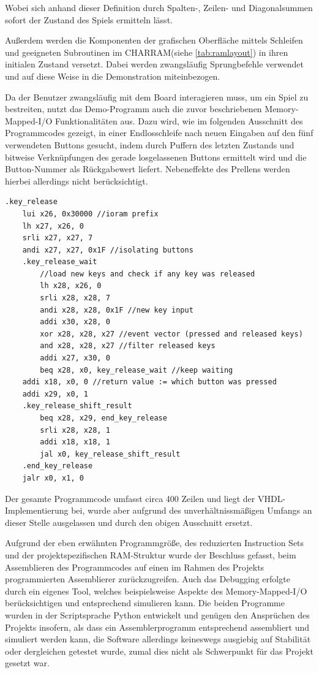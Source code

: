 Wobei sich anhand dieser Definition durch Spalten-, Zeilen- und Diagonalsummen sofort der Zustand des Spiels ermitteln l\"asst.

Au\ss{}erdem werden die Komponenten der grafischen Oberfl\"ache mittels Schleifen und geeigneten Subroutinen im CHARRAM(siehe \ref{tab:ramlayout}) in ihren initialen Zustand versetzt. Dabei werden zwangsl\"aufig Sprungbefehle verwendet und auf diese Weise in die Demonstration miteinbezogen.

Da der Benutzer zwangsl\"aufig mit dem Board interagieren muss, um ein Spiel zu bestreiten, nutzt das Demo-Programm auch die zuvor beschriebenen Memory-Mapped-I/O Funktionalit\"aten aus. Dazu wird, wie im folgenden Ausschnitt des Programmcodes gezeigt, in einer Endlosschleife nach neuen Eingaben auf den f\"unf verwendeten Buttons gesucht, indem durch Puffern des letzten Zustands und bitweise Verkn\"upfungen des gerade losgelassenen Buttons ermittelt wird und die Button-Nummer als R\"uckgabewert liefert. Nebeneffekte des Prellens werden hierbei allerdings nicht ber\"ucksichtigt.

\begin{lstlisting}
.key_release
	lui x26, 0x30000 //ioram prefix
	lh x27, x26, 0
	srli x27, x27, 7
	andi x27, x27, 0x1F //isolating buttons
	.key_release_wait
		//load new keys and check if any key was released
		lh x28, x26, 0
		srli x28, x28, 7
		andi x28, x28, 0x1F //new key input
		addi x30, x28, 0
		xor x28, x28, x27 //event vector (pressed and released keys)
		and x28, x28, x27 //filter released keys
		addi x27, x30, 0
		beq x28, x0, key_release_wait //keep waiting
	addi x18, x0, 0 //return value := which button was pressed
	addi x29, x0, 1
	.key_release_shift_result
		beq x28, x29, end_key_release
		srli x28, x28, 1
		addi x18, x18, 1
		jal x0, key_release_shift_result
	.end_key_release
	jalr x0, x1, 0
\end{lstlisting}

Der gesamte Programmcode umfasst circa 400 Zeilen und liegt der VHDL-Implementierung bei, wurde aber aufgrund des unverh\"altnissm\"a\ss{}igen Umfangs an dieser Stelle ausgelassen und durch den obigen Ausschnitt ersetzt.


Aufgrund der eben erw\"ahnten Programmgr\"o\ss{}e, des reduzierten Instruction Sets und der projektspezifischen RAM-Struktur wurde der Beschluss gefasst, beim Assemblieren des Programmcodes auf einen im Rahmen des Projekts programmierten Assemblierer zur\"uckzugreifen. Auch das Debugging erfolgte durch ein eigenes Tool, welches beispielsweise Aspekte des Memory-Mapped-I/O ber\"ucksichtigen und entsprechend simulieren kann. Die beiden Programme wurden in der Scriptsprache Python entwickelt und gen\"ugen den Anspr\"uchen des Projekts insofern, als dass ein Assemblerprogramm entsprechend assembliert und simuliert werden kann, die Software allerdings keineswegs ausgiebig auf Stabilit\"at oder dergleichen getestet wurde, zumal dies nicht als Schwerpunkt f\"ur das Projekt gesetzt war.

